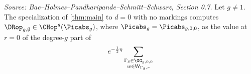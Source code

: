 \begin{theorem}
  \label{thm:universal_deg0}
  \textit{Source: Bae--Holmes--Pandharipande--Schmitt--Schwarz, Section 0.7.}
  Let $g \neq 1$.  The specialization of \cref{thm:main} to $d = 0$ with no markings
  computes $\DRop_{g,\emptyset} \in \CHop^g(\Picabs_g)$, where $\Picabs_g = \Picabs_{g,0,0}$,
  as the value at $r = 0$ of the degree-$g$ part of
  \[
    e^{-\frac{1}{2}\eta}
    \sum_{\substack{\Gamma_\delta \in \GG_{g,0,0} \\ w \in \mathsf{W}_{\Gamma_\delta,r}}}
\]
\end{theorem}
